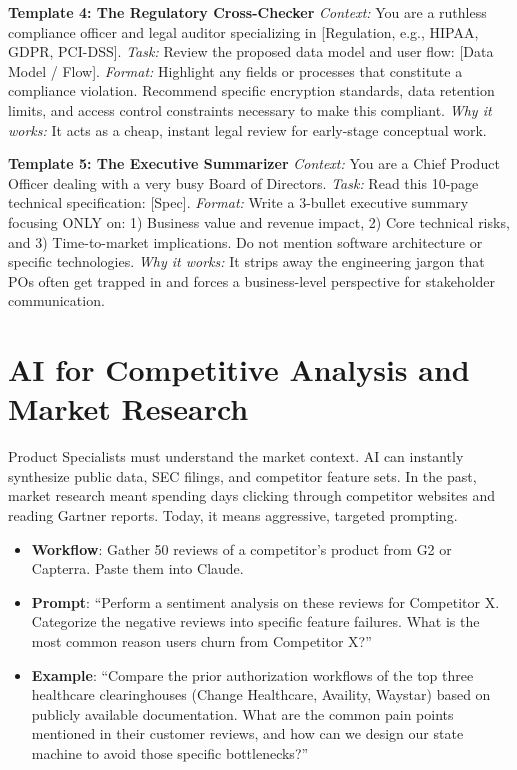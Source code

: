 \documentclass[
  11pt,
  openany,
  oneside]{book}
\providecommand{\tightlist}{%
  \setlength{\itemsep}{0pt}\setlength{\parskip}{0pt}}
\begin{document}
\textbf{Template 4: The Regulatory Cross-Checker} \emph{Context:} You
are a ruthless compliance officer and legal auditor specializing in
{[}Regulation, e.g., HIPAA, GDPR, PCI-DSS{]}. \emph{Task:} Review the
proposed data model and user flow: {[}Data Model / Flow{]}.
\emph{Format:} Highlight any fields or processes that constitute a
compliance violation. Recommend specific encryption standards, data
retention limits, and access control constraints necessary to make this
compliant. \emph{Why it works:} It acts as a cheap, instant legal review
for early-stage conceptual work.

\textbf{Template 5: The Executive Summarizer} \emph{Context:} You are a
Chief Product Officer dealing with a very busy Board of Directors.
\emph{Task:} Read this 10-page technical specification: {[}Spec{]}.
\emph{Format:} Write a 3-bullet executive summary focusing ONLY on: 1)
Business value and revenue impact, 2) Core technical risks, and 3)
Time-to-market implications. Do not mention software architecture or
specific technologies. \emph{Why it works:} It strips away the
engineering jargon that POs often get trapped in and forces a
business-level perspective for stakeholder communication.

\section{AI for Competitive Analysis and Market
Research}\label{ai-for-competitive-analysis-and-market-research}

Product Specialists must understand the market context. AI can instantly
synthesize public data, SEC filings, and competitor feature sets. In the
past, market research meant spending days clicking through competitor
websites and reading Gartner reports. Today, it means aggressive,
targeted prompting.

\begin{itemize}
\tightlist
\item
  \textbf{Workflow}: Gather 50 reviews of a competitor's product from G2
  or Capterra. Paste them into Claude.
\item
  \textbf{Prompt}: ``Perform a sentiment analysis on these reviews for
  Competitor X. Categorize the negative reviews into specific feature
  failures. What is the most common reason users churn from Competitor
  X?''
\item
  \textbf{Example}: ``Compare the prior authorization workflows of the
  top three healthcare clearinghouses (Change Healthcare, Availity,
  Waystar) based on publicly available documentation. What are the
  common pain points mentioned in their customer reviews, and how can we
  design our state machine to avoid those specific bottlenecks?''
\end{itemize}
\end{document}

